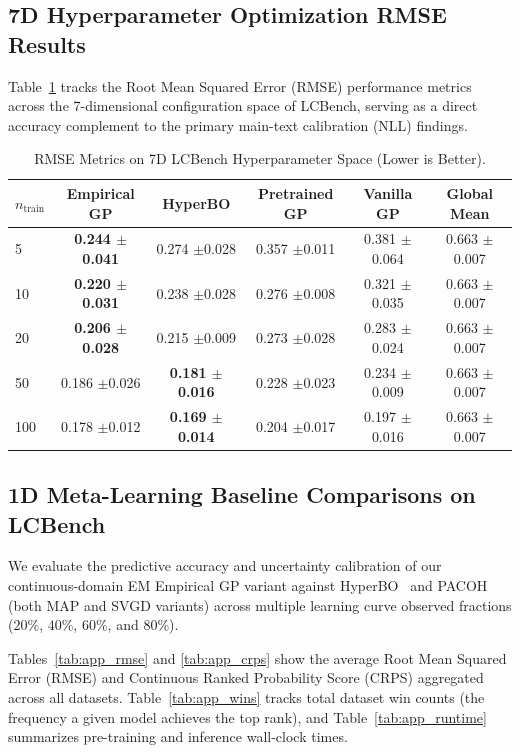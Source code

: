 \documentclass{article}
\begin{document}
\subsection{7D Hyperparameter Optimization RMSE Results}
\label{apd:higher_dim_additional_results}
Table~\ref{tab:app_hd_rmse} tracks the Root Mean Squared Error (RMSE) performance metrics across the 7-dimensional configuration space of LCBench, serving as a direct accuracy complement to the primary main-text calibration (NLL) findings.

\begin{table}[ht]
\centering
\small
\caption{RMSE Metrics on 7D LCBench Hyperparameter Space (Lower is Better).}
\label{tab:app_hd_rmse}
\begin{tabular}{lccccc}
\toprule
$n_{\text{train}}$ & Empirical GP & HyperBO & Pretrained GP & Vanilla GP & Global Mean \\
\midrule
5   & \textbf{0.244 $\pm$0.041} & 0.274 $\pm$0.028 & 0.357 $\pm$0.011 & 0.381 $\pm$0.064 & 0.663 $\pm$0.007 \\
10  & \textbf{0.220 $\pm$0.031} & 0.238 $\pm$0.028 & 0.276 $\pm$0.008 & 0.321 $\pm$0.035 & 0.663 $\pm$0.007 \\
20  & \textbf{0.206 $\pm$0.028} & 0.215 $\pm$0.009 & 0.273 $\pm$0.028 & 0.283 $\pm$0.024 & 0.663 $\pm$0.007 \\
50  & 0.186 $\pm$0.026          & \textbf{0.181 $\pm$0.016} & 0.228 $\pm$0.023 & 0.234 $\pm$0.009 & 0.663 $\pm$0.007 \\
100 & 0.178 $\pm$0.012          & \textbf{0.169 $\pm$0.014} & 0.204 $\pm$0.017 & 0.197 $\pm$0.016 & 0.663 $\pm$0.007 \\
\bottomrule
\end{tabular}
\end{table}

\subsection{1D Meta-Learning Baseline Comparisons on LCBench}
We evaluate the predictive accuracy and uncertainty calibration of our continuous-domain EM Empirical GP variant against HyperBO~\citep{wang2024hyperbo} and PACOH~\citep{rothfuss2021pacoh} (both MAP and SVGD variants) across multiple learning curve observed fractions ($20\%$, $40\%$, $60\%$, and $80\%$).

Tables~\ref{tab:app_rmse} and \ref{tab:app_crps} show the average Root Mean Squared Error (RMSE) and Continuous Ranked Probability Score (CRPS) aggregated across all datasets. Table~\ref{tab:app_wins} tracks total dataset win counts (the frequency a given model achieves the top rank), and Table~\ref{tab:app_runtime} summarizes pre-training and inference wall-clock times.
\end{document}
